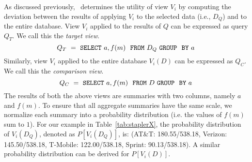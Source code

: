 




As discussed previously, \SeeDB\ determines the utility of view $V_i$
by computing the deviation between the results of applying $V_i$ to the 
selected data (i.e., $D_Q$) and to the entire database.
View $V_i$ applied to the results of $Q$ can be expressed as query $Q_T$. 
We call this the {\em target view}.
$$ Q_T\ =\ {\tt SELECT \ } a, f(m) \ \ {\tt FROM} \  D_Q\  {\tt GROUP \ \ BY} \ a$$ 
Similarly, view $V_i$ applied to the entire database $V_i (D)$ can be expressed as $Q_C$. 
We call this the {\em comparison view}. 
$$ Q_C\ =\ {\tt SELECT \ } a, f(m) \ \ {\tt FROM} \  D\  {\tt GROUP \ \ BY} \ a$$
The results of both the above views are summaries with two columns, namely $a$ and
$f(m)$. 
To ensure that all aggregate summaries have the same scale, we normalize each 
summary into a probability distribution (i.e. the values of $f(m)$ sum to $1$).
For our example in Table~\ref{tab:staplerX}, the probability distribution of
$V_i(D_Q)$, denoted as $P[V_i (D_Q)]$, is: (AT\&T: 180.55/538.18, Verizon:
145.50/538.18, T-Mobile: 122.00/538.18,  Sprint: 90.13/538.18). 
A similar probability distribution can be derived for $P[V_i (D)]$.

